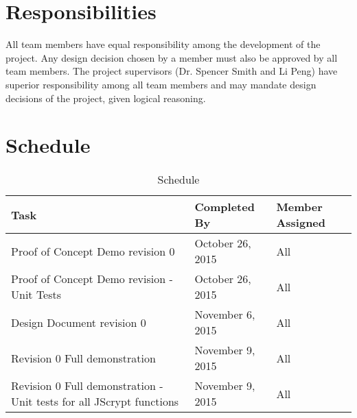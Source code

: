 \documentclass[12pt]{article}
\begin{document}
\section{Responsibilities}
All team members have equal responsibility among the development of the project. Any design decision chosen by a member must also be approved by all team members. The project supervisors (Dr. Spencer Smith and Li Peng) have  superior responsibility among all team members and may mandate design decisions of the project, given logical reasoning.

\section{Schedule}

\begin{table}[H]
\centering
	    \caption{Schedule}
	      \label{tab:table1}

	    \begin{tabular}{ | p{4cm} | p{4cm} | p{4cm}| }
	    	\hline
	      		\textbf{Task} & \textbf{Completed By } & \textbf{Member Assigned} \\
	      \hline

	     		Proof of Concept Demo revision 0 & October 26, 2015 & All \\
	     \hline

	     	Proof of Concept Demo revision - Unit Tests & October 26, 2015 & All \\
	     \hline

	     	Design Document revision  0 & November 6, 2015 & All \\

	     \hline

	  	 	 Revision 0 Full demonstration & November 9, 2015 & All \\
	     \hline
	     	Revision 0 Full demonstration - Unit tests for all JScrypt functions & November 9, 2015 & All \\
	     \hline

	    \end{tabular}
	   
	\end{table}
\end{document}
